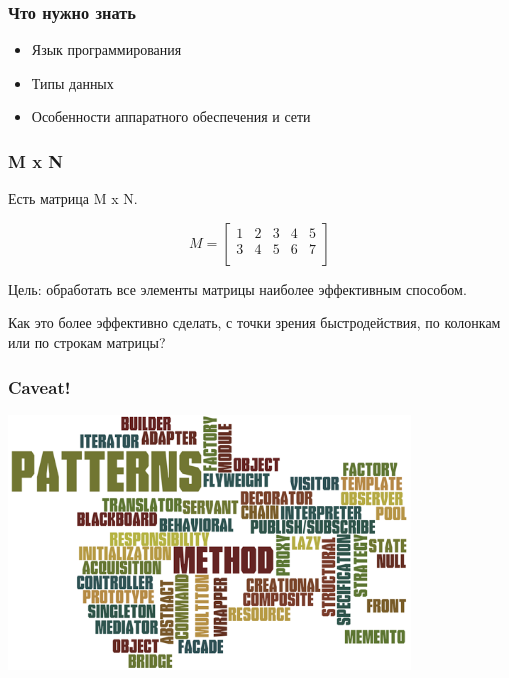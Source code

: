 \documentclass[10pt,pdf,hyperref={unicode}]{beamer}
\begin{document}
\begin{frame}
\frametitle{ Что нужно знать}

\begin{itemize}

	\item Язык программирования
	\item Типы данных
	\item  Особенности аппаратного обеспечения и сети

\end{itemize}

\end{frame}

\begin{frame}
\frametitle{ M x N }

\par
Есть матрица M x N. 

\par
\[
  M=
  \left[ {\begin{array}{ccccc}
   1 & 2 & 3 & 4 & 5\\
   3 & 4 & 5 & 6 & 7\\
  \end{array} } \right]
\]

\par
Цель: обработать все элементы матрицы наиболее эффективным способом.

\par
Как это более эффективно сделать, с точки зрения быстродействия, по колонкам или по строкам матрицы?

\end{frame}

\begin{frame}
\frametitle{ Caveat! }
	\center
		\includegraphics[width=0.8\textwidth]{./antipattern.png}
\end {frame}
\end{document}
